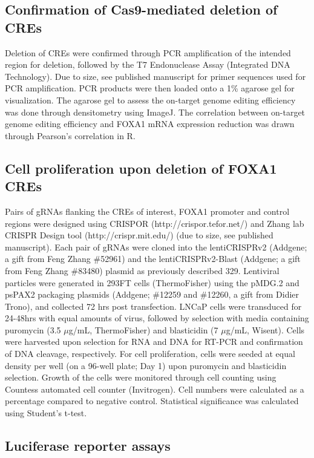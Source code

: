 \subsection{Confirmation of Cas9-mediated deletion of CREs}

Deletion of CREs were confirmed through PCR amplification of the intended region for deletion, followed by the T7 Endonuclease Assay (Integrated DNA Technology).
Due to size, see published manuscript for primer sequences used for PCR amplification.
PCR products were then loaded onto a 1\% agarose gel for visualization.
The agarose gel to assess the on-target genome editing efficiency was done through densitometry using ImageJ.
The correlation between on-target genome editing efficiency and FOXA1 mRNA expression reduction was drawn through Pearson's correlation in R.

\subsection{Cell proliferation upon deletion of FOXA1 CREs}

Pairs of gRNAs flanking the CREs of interest, FOXA1 promoter and control regions were designed using CRISPOR (http://crispor.tefor.net/) and Zhang lab CRISPR Design tool (http://crispr.mit.edu/) (due to size, see published manuscript).
Each pair of gRNAs were cloned into the lentiCRISPRv2 (Addgene; a gift from Feng Zhang \#52961) and the lentiCRISPRv2-Blast (Addgene; a gift from Feng Zhang \#83480) plasmid as previously described 329.
Lentiviral particles were generated in 293FT cells (ThermoFisher) using the pMDG.2 and psPAX2 packaging plasmids (Addgene; \#12259 and \#12260, a gift from Didier Trono), and collected 72 hrs post transfection.
LNCaP cells were transduced for 24-48hrs with equal amounts of virus, followed by selection with media containing puromycin (3.5 $\mu$g/mL, ThermoFisher) and blasticidin (7 $\mu$g/mL, Wisent).
Cells were harvested upon selection for RNA and DNA for RT-PCR and confirmation of DNA cleavage, respectively.
For cell proliferation, cells were seeded at equal density per well (on a 96-well plate; Day 1) upon puromycin and blasticidin selection.
Growth of the cells were monitored through cell counting using Countess \texttrademark automated cell counter (Invitrogen).
Cell numbers were calculated as a percentage compared to negative control.
Statistical significance was calculated using Student's t-test.

\subsection{Luciferase reporter assays}

